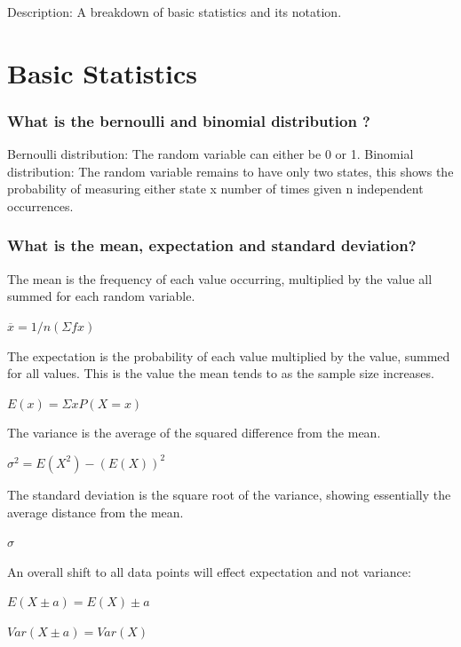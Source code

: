 \documentclass[
]{article}
\author{}
\date{}
\begin{document}
Description: A breakdown of basic statistics and its notation.

\hypertarget{basic-statistics}{%
\section{Basic Statistics}\label{basic-statistics}}

\hypertarget{what-is-the-bernoulli-and-binomial-distribution}{%
\subsubsection{What is the bernoulli and binomial distribution
?}\label{what-is-the-bernoulli-and-binomial-distribution}}

Bernoulli distribution: The random variable can either be 0 or 1.
Binomial distribution: The random variable remains to have only two
states, this shows the probability of measuring either state x number of
times given n independent occurrences.

\hypertarget{what-is-the-mean-expectation-and-standard-deviation}{%
\subsubsection{What is the mean, expectation and standard
deviation?}\label{what-is-the-mean-expectation-and-standard-deviation}}

The mean is the frequency of each value occurring, multiplied by the
value all summed for each random variable.

\(\overline{x} = 1/n(\Sigma fx)\)

The expectation is the probability of each value multiplied by the
value, summed for all values. This is the value the mean tends to as the
sample size increases.

\(E(x) = \Sigma x P(X=x)\)

The variance is the average of the squared difference from the mean.

\(\sigma^2 = E(X^2) - (E(X))^2\)

The standard deviation is the square root of the variance, showing
essentially the average distance from the mean.

\(\sigma\)

An overall shift to all data points will effect expectation and not
variance:

\(E(X \pm a) = E(X) \pm a\)

\(Var(X \pm a) = Var(X)\)
\end{document}

